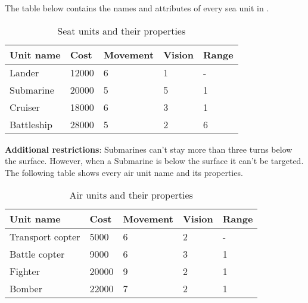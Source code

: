 The table below contains the names and attributes of every sea unit in \game.\\

\begin{table}[H]
    \label{tab:sea-units}
    \begin{center}
    \begin{tabular}{| l | m{1cm} | m{1.7cm} | m{1.0cm} | m{1.5cm} |}
        \hline
        \textbf{Unit name} & \textbf{Cost} & \textbf{Movement} & \textbf{Vision} & \textbf{Range}\\
        \hline
        Lander & 12000 & 6 & 1 & - \\
        \hline
        Submarine & 20000 & 5 & 5 & 1 \\
        \hline
        Cruiser & 18000 & 6 & 3 & 1 \\
        \hline
        Battleship & 28000 & 5 & 2 & 6 \\
        \hline
    \end{tabular}
    \end{center}
\caption{Seat units and their properties}
\end{table}

\textbf{Additional restrictions}: Submarines can't stay more than three turns
below the surface. However, when a Submarine is below the surface it can't be
targeted.\\


The following table shows every air unit name and its properties.\\

\begin{table}[H]
    \label{tab:air-units}
    \begin{center}
    \begin{tabular}{| l | m{1cm} | m{1.7cm} | m{1.0cm} | m{1.5cm} |}
        \hline
        \textbf{Unit name} & \textbf{Cost} & \textbf{Movement} & \textbf{Vision} & \textbf{Range}\\
        \hline
        Transport copter & 5000 & 6 & 2 & - \\
        \hline
        Battle copter & 9000 & 6 & 3 & 1 \\
        \hline
        Fighter & 20000 & 9 & 2 & 1 \\
        \hline
        Bomber & 22000 & 7 & 2 & 1 \\
        \hline
    \end{tabular}
    \end{center}
\caption{Air units and their properties}
\end{table}

